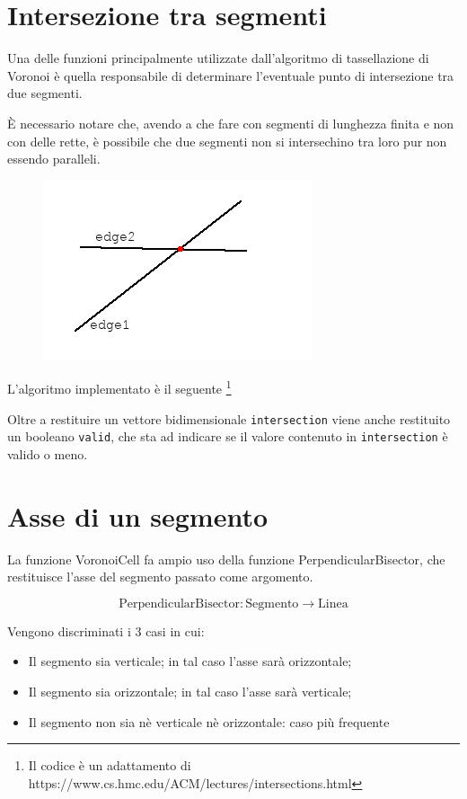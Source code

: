 \documentclass[11pt,a4paper]{report}
\newcommand{\modelicaclass}[1]{
	
}
\newcommand{\name}[1]{{\ttfamily #1}}
\begin{document}
\section{Intersezione tra segmenti}

Una delle funzioni principalmente utilizzate dall'algoritmo di tassellazione di Voronoi è quella responsabile di determinare l'eventuale punto di intersezione tra due segmenti.

È necessario notare che, avendo a che fare con segmenti di lunghezza finita e non con delle rette, è possibile che due segmenti non si intersechino tra loro pur non essendo paralleli.

\begin{figure}[H]
\centering
\includegraphics[scale=0.5]{intersection.png}
\end{figure}

L'algoritmo implementato è il seguente \footnote{Il codice è un adattamento di https://www.cs.hmc.edu/ACM/lectures/intersections.html}

\modelicaclass{SegmentsIntersection.mo}

Oltre a restituire un vettore bidimensionale \verb|intersection| viene anche restituito un booleano \verb|valid|, che sta ad indicare se il valore contenuto in \verb|intersection| è valido o meno.

\section{Asse di un segmento}

La funzione \name{VoronoiCell} fa ampio uso della funzione \name{PerpendicularBisector}, che restituisce l'asse del segmento passato come argomento.

\[
\text{PerpendicularBisector} : \text{Segmento} \longrightarrow \text{Linea}
\]


Vengono discriminati i 3 casi in cui:

\begin{itemize}
	\item Il segmento sia verticale; in tal caso l'asse sarà orizzontale;
	\item Il segmento sia orizzontale; in tal caso l'asse sarà verticale;
	\item Il segmento non sia nè verticale nè orizzontale: caso più frequente
\end{itemize}
\end{document}
